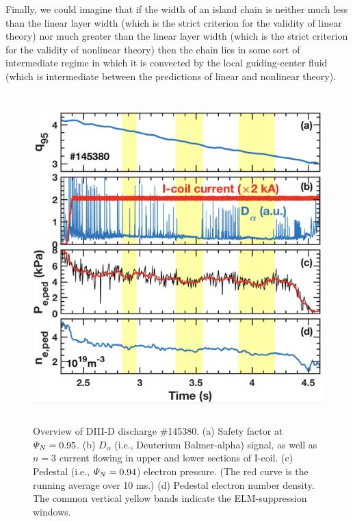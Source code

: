 \documentclass[12pt,prb,aps]{revtex4-1}
\begin{document}
Finally, we could imagine that if the width of an island chain is neither much less than the linear layer width (which is the strict
criterion for the validity of linear theory) nor much greater than the linear layer width (which is the strict criterion for
the validity of nonlinear theory) then the chain lies in some sort of intermediate regime in which it is
convected by the local guiding-center fluid (which is intermediate between the predictions of linear and nonlinear theory). 

\newpage

\begin{figure}
\includegraphics[height=5in]{fig1.pdf}
\caption{Overview of DIII-D discharge \#145380.
(a) Safety factor at  ${\mit\Psi}_N=0.95$. 
(b) $D_\alpha$ (i.e., Deuterium Balmer-alpha) signal, as well as $n=3$ current flowing in upper and lower sections of I-coil. 
(c) Pedestal (i.e., ${\mit\Psi}_N=0.94$)
electron pressure. (The red curve is the running average over 10 ms.) (d) Pedestal electron number density. The common vertical yellow bands indicate the ELM-suppression windows.}\label{fig1}
\end{figure}
\end{document}
